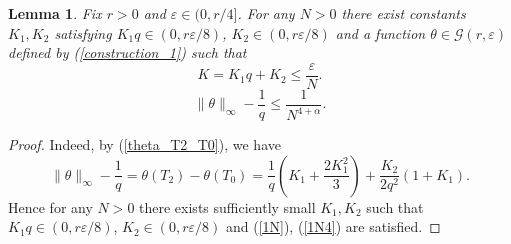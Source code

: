 \documentclass[a4paper,12pt,reqno]{amsart}
\newtheorem{lemma}[theorem]{Lemma}
\theoremstyle{definition}
\theoremstyle{remark}
\newcommand{\eps}{\varepsilon}
\newcommand{\calG}{\mathcal{G}}
\begin{document}
\begin{lemma}
\label{properties_theta}
Fix $r > 0$ and $\eps \in (0,r/4]$. For any $N > 0$ there exist constants $K_1, K_2$ satisfying $K_1 q \in (0,r \eps/8)$, $K_2 \in (0,r \eps/8)$ and a function $\theta \in \calG(r, \eps)$ defined by (\ref{construction_1}) such that 
\begin{equation}
\label{1N}
K = K_1 q + K_2 \le \frac{\eps}{N}.
\end{equation}
\begin{equation}
\label{1N4}
\|\theta\|_{\infty} - \frac{1}{q} \le \frac{1}{N^{4 + \alpha}}.
\end{equation}
\end{lemma}
\begin{proof}
Indeed, by (\ref{theta_T2_T0}), we have
$$
\|\theta\|_{\infty} - \frac{1}{q} = \theta(T_2) - \theta(T_0) = 
\frac{1}{q} \left(K_1 + \frac{2 K_1^2}{3}\right) + \frac{K_2}{2q^2} \left(1+K_1\right).
$$
Hence for any $N > 0$ there exists sufficiently small $K_1, K_2$ such that $K_1 q \in (0,r \eps/8)$, $K_2 \in (0,r \eps/8)$ and (\ref{1N}), (\ref{1N4}) are satisfied.
\end{proof}

\end{document}
